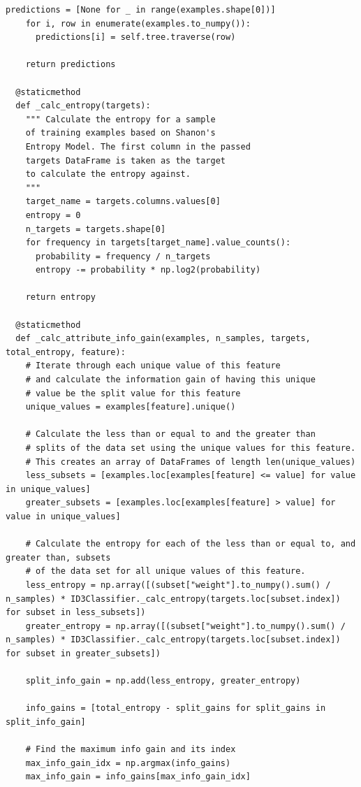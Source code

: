 \documentclass[a4paper]{article}
\begin{document}
\begin{lstlisting}[basicstyle= \scriptsize]
    predictions = [None for _ in range(examples.shape[0])]
    for i, row in enumerate(examples.to_numpy()):
      predictions[i] = self.tree.traverse(row) 

    return predictions
  
  @staticmethod
  def _calc_entropy(targets):
    """ Calculate the entropy for a sample
    of training examples based on Shanon's 
    Entropy Model. The first column in the passed
    targets DataFrame is taken as the target
    to calculate the entropy against.
    """
    target_name = targets.columns.values[0]
    entropy = 0
    n_targets = targets.shape[0]
    for frequency in targets[target_name].value_counts():
      probability = frequency / n_targets 
      entropy -= probability * np.log2(probability)

    return entropy

  @staticmethod
  def _calc_attribute_info_gain(examples, n_samples, targets, total_entropy, feature):
    # Iterate through each unique value of this feature
    # and calculate the information gain of having this unique
    # value be the split value for this feature 
    unique_values = examples[feature].unique()

    # Calculate the less than or equal to and the greater than
    # splits of the data set using the unique values for this feature.
    # This creates an array of DataFrames of length len(unique_values)
    less_subsets = [examples.loc[examples[feature] <= value] for value in unique_values] 
    greater_subsets = [examples.loc[examples[feature] > value] for value in unique_values]

    # Calculate the entropy for each of the less than or equal to, and greater than, subsets 
    # of the data set for all unique values of this feature.
    less_entropy = np.array([(subset["weight"].to_numpy().sum() / n_samples) * ID3Classifier._calc_entropy(targets.loc[subset.index]) for subset in less_subsets])
    greater_entropy = np.array([(subset["weight"].to_numpy().sum() / n_samples) * ID3Classifier._calc_entropy(targets.loc[subset.index]) for subset in greater_subsets])

    split_info_gain = np.add(less_entropy, greater_entropy)

    info_gains = [total_entropy - split_gains for split_gains in split_info_gain]

    # Find the maximum info gain and its index
    max_info_gain_idx = np.argmax(info_gains)
    max_info_gain = info_gains[max_info_gain_idx]


\end{lstlisting}
\end{document}

